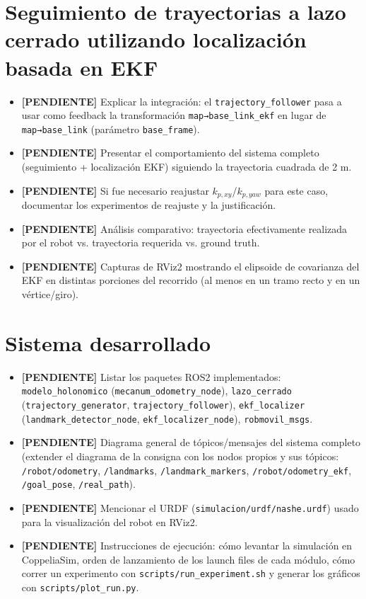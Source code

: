 \documentclass[11pt,a4paper]{article}
\newcommand{\TODO}[1]{\textcolor{todocolor}{\textbf{[PENDIENTE]} #1}}
\newenvironment{tareas}{\begin{itemize}\setlength{\itemsep}{2pt}}{\end{itemize}}
\begin{document}
\section{Seguimiento de trayectorias a lazo cerrado utilizando localización basada en EKF}
\begin{tareas}
    \item \TODO{Explicar la integración: el \texttt{trajectory\_follower} pasa a usar como feedback la transformación \texttt{map→base\_link\_ekf} en lugar de \texttt{map→base\_link} (parámetro \texttt{base\_frame}).}
    \item \TODO{Presentar el comportamiento del sistema completo (seguimiento + localización EKF) siguiendo la trayectoria cuadrada de 2 m.}
    \item \TODO{Si fue necesario reajustar $k_{p,xy}$/$k_{p,yaw}$ para este caso, documentar los experimentos de reajuste y la justificación.}
    \item \TODO{Análisis comparativo: trayectoria efectivamente realizada por el robot vs. trayectoria requerida vs. ground truth.}
    \item \TODO{Capturas de RViz2 mostrando el elipsoide de covarianza del EKF en distintas porciones del recorrido (al menos en un tramo recto y en un vértice/giro).}
\end{tareas}

\section{Sistema desarrollado}
\begin{tareas}
    \item \TODO{Listar los paquetes ROS2 implementados: \texttt{modelo\_holonomico} (\texttt{mecanum\_odometry\_node}), \texttt{lazo\_cerrado} (\texttt{trajectory\_generator}, \texttt{trajectory\_follower}), \texttt{ekf\_localizer} (\texttt{landmark\_detector\_node}, \texttt{ekf\_localizer\_node}), \texttt{robmovil\_msgs}.}
    \item \TODO{Diagrama general de tópicos/mensajes del sistema completo (extender el diagrama de la consigna con los nodos propios y sus tópicos: \texttt{/robot/odometry}, \texttt{/landmarks}, \texttt{/landmark\_markers}, \texttt{/robot/odometry\_ekf}, \texttt{/goal\_pose}, \texttt{/real\_path}).}
    \item \TODO{Mencionar el URDF (\texttt{simulacion/urdf/nashe.urdf}) usado para la visualización del robot en RViz2.}
    \item \TODO{Instrucciones de ejecución: cómo levantar la simulación en CoppeliaSim, orden de lanzamiento de los launch files de cada módulo, cómo correr un experimento con \texttt{scripts/run\_experiment.sh} y generar los gráficos con \texttt{scripts/plot\_run.py}.}
\end{tareas}
\end{document}
